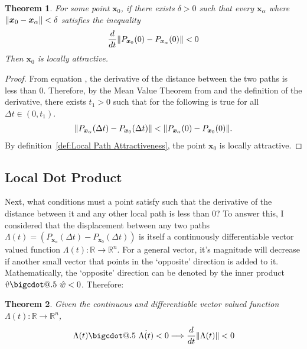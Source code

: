 \documentclass{article}
\makeatletter
\newcommand{\B}[1]{\boldsymbol{#1}}
\newcommand*\bigcdot{\mathpalette\bigcdot@{.5}}
\newcommand*\bigcdot@[2]{\mathbin{\vcenter{\hbox{\scalebox{#2}{$\m@th#1\bullet$}}}}}
\DeclarePairedDelimiter\norm{\lVert}{\rVert}%
\newtheorem{theorem}{Theorem}[section]
\theoremstyle{definition}
\theoremstyle{remark}
\makeatother
\begin{document}
\begin{theorem}
  \label{theorem:Local Distance}
  For some point $\B{x}_0$, if there exists $\delta > 0$ such that every
  $\B{x}_\alpha$ where $\norm{\B{x}_0 - \B{x}_\alpha} < \delta$ satisfies the inequality
  \begin{align}
    \frac{d}{dt} \norm{P_{\B{x}_0}(0) - P_{\B{x}_\alpha}(0)} < 0 \label{eq:norm-inequality}
  \end{align}
  Then $\B{x}_0$ is locally attractive.
\end{theorem}

\begin{proof}
  From equation , the derivative of the distance between the two paths is less than 0. 
  Therefore, by the Mean Value Theorem from \cite{AdvancedCalculus}
  and the definition of the derivative, there exists $t_1 > 0$ such that for the following is true for all 
  $\Delta t \in \left(0, t_1\right)$.
  \begin{align}
  \norm{P_{\B{x}_\alpha}(\Delta t) - P_{\B{x}_0}(\Delta t)} < \norm{P_{\B{x}_\alpha}(0) - P_{\B{x}_0}(0)}.\label{attractive-condition}
  \end{align}
  By definition~\ref{def:Local Path Attractiveness}, the point $\B{x}_0$ is locally attractive.
\end{proof}


\subsection{Local Dot Product}
Next, what conditions must a point satisfy such that the derivative of the distance between
it and any other local path is less than 0? To answer this, I considered that the displacement
between any two paths $\Lambda(t) = (P_{\B{x}_\alpha}(\Delta t) - P_{\B{x}_0}(\Delta t))$ is itself
a continuously differentiable vector valued function $\Lambda(t) : \mathbb{R} \to \mathbb{R}^n$. For a general vector,
it's magnitude will decrease if another small vector that points in the `opposite' direction is added to it.
Mathematically, the `opposite' direction can be denoted by the inner product $\hat{v} \bigcdot~ \hat{w} < 0$.
Therefore:



\begin{theorem}
  \label{theorem:Dot Product Distance}
  Given the continuous and differentiable vector valued function $\Lambda(t) : \mathbb{R} \to \mathbb{R}^n$, 
  $$ \Lambda(t) \bigcdot~ \dot{\Lambda(t)} < 0 \Longrightarrow \frac{d}{dt}  \norm{\Lambda(t)}  < 0$$
\end{theorem}
\end{document}
